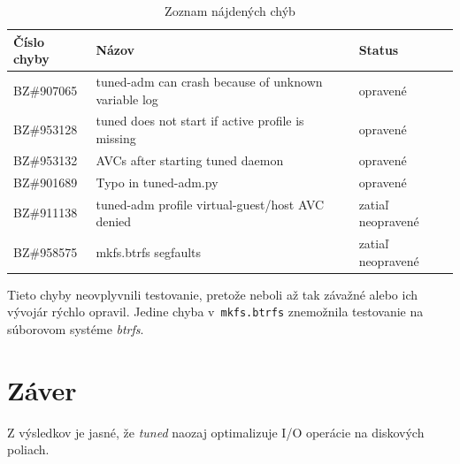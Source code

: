 \begin{table}[H]
\begin{center}
\begin{tabular}{|l|l|l|}
    \hline
    \textbf{Číslo chyby} & \textbf{Názov} & \textbf{Status} \\
    \hline
    BZ\#907065 & tuned-adm can crash because of unknown variable log & opravené \\
    BZ\#953128 & tuned does not start if active profile is missing & opravené \\
    BZ\#953132 & AVCs after starting tuned daemon & opravené \\
    BZ\#901689 & Typo in tuned-adm.py & opravené \\
    BZ\#911138 & tuned-adm profile virtual-guest/host AVC denied & zatiaľ neopravené \\
    BZ\#958575 & mkfs.btrfs segfaults & zatiaľ neopravené \\
    \hline
\end{tabular}
\caption{Zoznam nájdených chýb}
\label{tab:bugs}
\end{center}
\end{table}

Tieto chyby neovplyvnili testovanie, pretože neboli až tak závažné alebo ich
vývojár rýchlo opravil. Jedine chyba v~\texttt{mkfs.btrfs} znemožnila
testovanie na súborovom systéme \emph{btrfs}.


%
%

\chapter{Záver}

Z výsledkov je jasné, že \emph{tuned} naozaj optimalizuje I/O operácie na
diskových poliach. 
